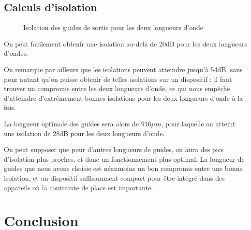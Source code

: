 \documentclass[a4paper,11pt]{report}
\begin{document}
\section{Calculs d'isolation}

\begin{figure}[h]
    \begin{center}
        \caption{Isolation des guides de sortie pour les deux longueurs d'onde}
        \label{big_graph}
    \end{center}
\end{figure}

On peut facilement obtenir une isolation au-delà de 20dB pour les deux longueurs d'ondes.

On remarque par ailleurs que les isolations peuvent atteindre jusqu'à 54dB, sans pour autant qu'on puisse obtenir de telles isolations sur un dispositif : il faut trouver un compromis entre les deux longueurs d'onde, ce qui nous empêche d'atteindre d'extrêmement bonnes isolations pour les deux longueurs d'onde à la fois.

La longueur optimale des guides sera alors de $916\mu m$, pour laquelle on atteint une isolation de 28dB pour les deux longueurs d'onde.


On peut supposer que pour d'autres longueurs de guides, on aura des pics d'isolation plus proches, et donc un fonctionnement plus optimal.\newline
La longueur de guides que nous avons choisie est néanmoins un bon compromis entre une bonne isolation, et un dispositif suffisamment compact pour être intégré dans des appareils où la contrainte de place est importante.


\chapter*{Conclusion}
\end{document}
